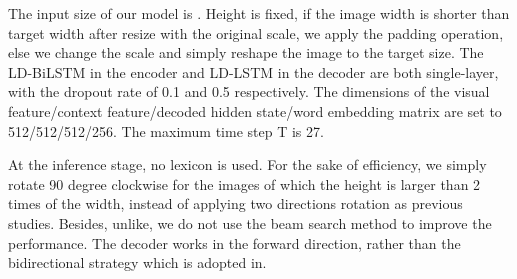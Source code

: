\documentclass[runningheads]{llncs}
\begin{document}
The input size of our model is . Height is fixed, if the image width is shorter than target width after resize with the original scale, we apply the padding operation, else we change the scale and simply reshape the image to the target size. The LD-BiLSTM in the encoder and LD-LSTM in the decoder are both single-layer, with the dropout rate of 0.1 and 0.5 respectively. The dimensions of the visual feature/context feature/decoded hidden state/word embedding matrix are set to 512/512/512/256. The maximum time step T is 27.

At the inference stage, no lexicon is used. For the sake of efficiency, we simply rotate 90 degree clockwise for the images of which the height is larger than 2 times of the width, instead of applying two directions rotation as previous studies\cite{shi2018aster,litman2020scatter,li2019show,lu2019master,yue2020robustscanner}. Besides, unlike\cite{shi2018aster,li2019show}, we do not use the beam search method to improve the performance. The decoder works in the forward direction, rather than the bidirectional strategy which is adopted in\cite{shi2018aster,yang2020holistic}.
\end{document}
